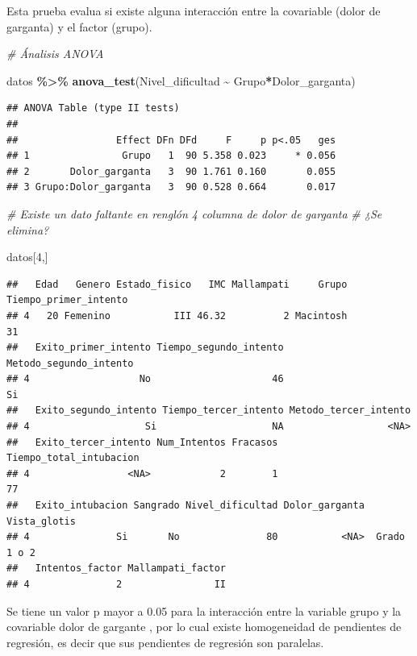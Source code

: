 \documentclass[
]{article}
\newenvironment{Shaded}{\begin{snugshade}}{\end{snugshade}}
\newcommand{\CommentTok}[1]{\textcolor[rgb]{0.56,0.35,0.01}{\textit{#1}}}
\newcommand{\DecValTok}[1]{\textcolor[rgb]{0.00,0.00,0.81}{#1}}
\newcommand{\FunctionTok}[1]{\textcolor[rgb]{0.13,0.29,0.53}{\textbf{#1}}}
\newcommand{\NormalTok}[1]{#1}
\newcommand{\SpecialCharTok}[1]{\textcolor[rgb]{0.81,0.36,0.00}{\textbf{#1}}}
\begin{document}
Esta prueba evalua si existe alguna interacción entre la covariable
(dolor de garganta) y el factor (grupo).

\begin{Shaded}
\begin{Highlighting}[]
\CommentTok{\# Ánalisis ANOVA}

\NormalTok{datos }\SpecialCharTok{\%\textgreater{}\%} \FunctionTok{anova\_test}\NormalTok{(Nivel\_dificultad }\SpecialCharTok{\textasciitilde{}}\NormalTok{ Grupo}\SpecialCharTok{*}\NormalTok{Dolor\_garganta)}
\end{Highlighting}
\end{Shaded}

\begin{verbatim}
## ANOVA Table (type II tests)
## 
##                 Effect DFn DFd     F     p p<.05   ges
## 1                Grupo   1  90 5.358 0.023     * 0.056
## 2       Dolor_garganta   3  90 1.761 0.160       0.055
## 3 Grupo:Dolor_garganta   3  90 0.528 0.664       0.017
\end{verbatim}

\begin{Shaded}
\begin{Highlighting}[]
\CommentTok{\# Existe un dato faltante en renglón 4 columna de dolor de garganta}
\CommentTok{\# ¿Se elimina?}

\NormalTok{datos[}\DecValTok{4}\NormalTok{,]}
\end{Highlighting}
\end{Shaded}

\begin{verbatim}
##   Edad   Genero Estado_fisico   IMC Mallampati     Grupo Tiempo_primer_intento
## 4   20 Femenino           III 46.32          2 Macintosh                    31
##   Exito_primer_intento Tiempo_segundo_intento Metodo_segundo_intento
## 4                   No                     46                     Si
##   Exito_segundo_intento Tiempo_tercer_intento Metodo_tercer_intento
## 4                    Si                    NA                  <NA>
##   Exito_tercer_intento Num_Intentos Fracasos Tiempo_total_intubacion
## 4                 <NA>            2        1                      77
##   Exito_intubacion Sangrado Nivel_dificultad Dolor_garganta Vista_glotis
## 4               Si       No               80           <NA>  Grado 1 o 2
##   Intentos_factor Mallampati_factor
## 4               2                II
\end{verbatim}

Se tiene un valor p mayor a 0.05 para la interacción entre la variable
grupo y la covariable dolor de gargante , por lo cual existe
homogeneidad de pendientes de regresión, es decir que sus pendientes de
regresión son paralelas.
\end{document}
